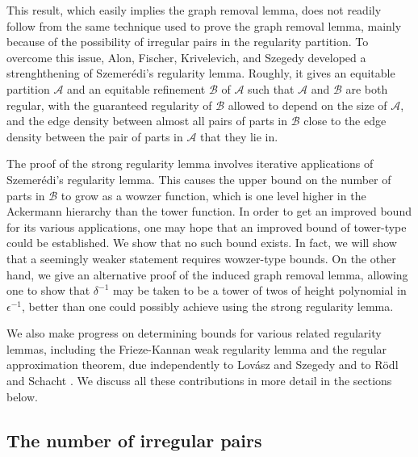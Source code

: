 \documentclass[11pt]{article}
\begin{document}
This result, which easily implies the graph removal lemma, does not readily
follow from the same technique used to prove the graph removal lemma, mainly
because of the possibility of irregular pairs in the regularity partition. To
overcome this issue, Alon, Fischer, Krivelevich, and Szegedy \cite{AFKS}
developed a strenghthening of Szemer\'edi's regularity lemma. Roughly, it gives
an equitable partition $\mathcal{A}$ and an equitable refinement $\mathcal{B}$
of $\mathcal{A}$ such that $\mathcal{A}$ and $\mathcal{B}$ are both regular, with the guaranteed regularity of $\mathcal{B}$ allowed to depend on the size of $\mathcal{A}$, and the edge density between almost all pairs of parts in $\mathcal{B}$ close to the edge
density between the pair of parts in $\mathcal{A}$ that they lie in.

The proof of the strong regularity lemma involves iterative applications of
Szemer\'edi's regularity lemma. This causes the upper bound on the number of
parts in $\mathcal{B}$ to grow as a wowzer function, which is one level higher
in the Ackermann hierarchy than the tower function. In order to get an improved
bound for its various applications, one may hope that an improved bound of
tower-type could be established. We show that no such bound exists. In fact, we
will show that a seemingly weaker statement requires wowzer-type bounds. On the
other hand, we give an alternative proof of the induced graph removal lemma,
allowing one to show that $\delta^{-1}$ may be taken to be a tower of twos of
height polynomial in $\epsilon^{-1}$, better than one could possibly achieve
using the strong regularity lemma.

We also make progress on determining bounds for various related regularity
lemmas, including the Frieze-Kannan weak regularity lemma \cite{FrKa, FrKa1}
and the regular approximation theorem, due independently to Lov\'asz and
Szegedy \cite{LS} and to R\"odl and Schacht \cite{RS07}. We discuss all these
contributions in more detail in the sections below.


\subsection{The number of irregular pairs}\label{irregularpairssection}
\end{document}
